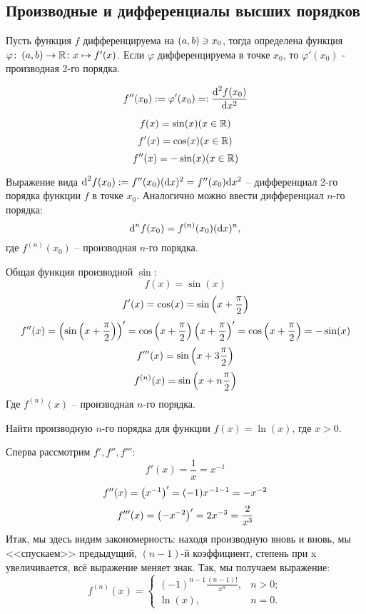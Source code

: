 \subsection{Производные и дифференциалы высших порядков}
\begin{definition}
    Пусть функция \( f \) дифференцируема на \( \left( a, b \right) \ni x_0 \), тогда определена функция \( \varphi\colon \left( a, b \right) \to \mathbb{R} \colon x \mapsto f'(x) \). Если \( \varphi \) дифференцируема в точке \( x_0 \), то \( \varphi'(x_0) \) - производная 2-го порядка.
\end{definition}
\begin{dsg} 
    \[ f''(x_0) := \varphi'(x_0) =: \frac{\text{d}^2f(x_0)}{\text{d} x^2}\]
\end{dsg}
\begin{example}
    \[ f(x)  = \sin(x) (x \in \mathbb{R}) \]
    \[ f'(x) = \cos(x) (x \in \mathbb{R}) \]
    \[ f''(x)=-\sin(x) (x \in \mathbb{R}) \]
\end{example}
\begin{definition} 
    Выражение вида \( \text{d}^2f(x_0) := f''(x_0)(\text{d} x)^2 = f''(x_0)\text{d} x^2 \) -- дифференциал 2-го порядка функции \( f \) в точке \( x_0 \). Аналогично можно ввести дифференциал \( n \)-го порядка: 
    \[ \text{d}^nf(x_0) = f^{(n)}(x_0)(\text{d} x)^n, \]
    где \( f^{(n)}(x_0) \) -- производная \( n \)-го порядка.
\end{definition}
\begin{example} 
    Общая функция производной \( \sin \):
    \[ f(x) = \sin(x) \]
    \[ f'(x) = \cos(x) = \sin\left( x + \frac{\pi}{2} \right) \]
    \[ f''(x) = \left( \sin\left( x + \frac{\pi}{2} \right) \right)' = \cos\left( x + \frac{\pi}{2} \right)\left( x+\frac{\pi}{2} \right)' = \cos\left( x+\frac{\pi}{2} \right) = -\sin(x) \]
    \[ f'''(x) = \sin{\left( x + 3\frac{\pi}{2} \right)} \]
    \[ f^{(n)}(x)=\sin{\left( x+n\frac{\pi}{2} \right)} \]
    Где \( f^{(n)}(x) \) -- производная \( n \)-го порядка.
\end{example}
\begin{problem} 
    Найти производную \( n \)-го порядка для функции \( f(x) = \ln(x) \), где \( x > 0 \).
\end{problem}
Сперва рассмотрим \( f', f'', f''' \):
\[ f'(x) = \frac{1}{x} = x^{-1} \]
\[ f''(x) = \left( x^{-1} \right)' = (-1)x^{-1-1} = -x^{-2} \]
\[ f'''(x) = \left( -x^{-2} \right)' = 2x^{-3} = \frac{2}{x^3} \]
Итак, мы здесь видим закономерность: находя производную вновь и вновь, мы <<спускаем>> предыдущий, \( (n-1) \)-й коэффициент, степень при x увеличивается, всё выражение меняет знак. Так, мы получаем выражение:
\begin{equation} \label{ExLnDer}
    f^{(n)}(x) = \left\{ \begin{array}{ll}
        (-1)^{n-1}\frac{(n-1)!}{x^n}, & n > 0;\\
        \ln(x), &  n = 0.
    \end{array} \right.
\end{equation}
